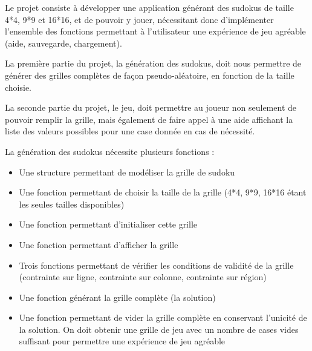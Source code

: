 \documentclass[a4paper, 12pt]{article}
\begin{document}
	\par Le projet consiste à développer une application générant des sudokus de taille 4*4, 9*9 et 16*16, et de pouvoir y jouer, nécessitant donc d'implémenter l'ensemble des fonctions permettant à l'utilisateur une expérience de jeu agréable (aide, sauvegarde, chargement).
	\par La première partie du projet, la génération des sudokus, doit nous permettre de générer des grilles complètes de façon pseudo-aléatoire, en fonction de la taille choisie.
	\par La seconde partie du projet, le jeu, doit permettre au joueur non seulement de pouvoir remplir la grille, mais également de faire appel à une aide affichant la liste des valeurs possibles pour une case donnée en cas de nécessité.
	\\
	\par La génération des sudokus nécessite plusieurs fonctions :
	\begin{itemize}
		\item Une structure permettant de modéliser la grille de sudoku
		\item Une fonction permettant de choisir la taille de la grille (4*4, 9*9, 16*16 étant les seules tailles disponibles)
		\item Une fonction permettant d'initialiser cette grille
		\item Une fonction permettant d'afficher la grille
		\item Trois fonctions permettant de vérifier les conditions de validité de la grille (contrainte sur ligne, contrainte sur colonne, contrainte sur région)
		\item Une fonction générant la grille complète (la solution)
		\item Une fonction permettant de vider la grille complète en conservant l'unicité de la solution. On doit obtenir une grille de jeu avec un nombre de cases vides suffisant pour permettre une expérience de jeu agréable\\
	\end{itemize}
	
\end{document}
